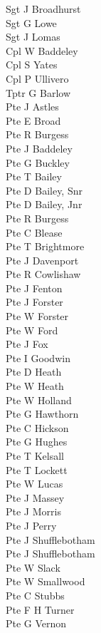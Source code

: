 \begin{multicols}{2}
  Sgt J Broadhurst \\
  Sgt G Lowe \\
  Sgt J Lomas \\
  Cpl W Baddeley \\
  Cpl S Yates \\
  Cpl P Ullivero \\
  Tptr G Barlow \\
  Pte J Astles \\
  Pte E Broad \\
  Pte R Burgess \\
  Pte J Baddeley \\
  Pte G Buckley \\
  Pte T Bailey \\
  Pte D Bailey, Snr \\
  Pte D Bailey, Jnr \\
  Pte R Burgess \\
  Pte C Blease \\
  Pte T Brightmore \\
  Pte J Davenport \\
  Pte R Cowlishaw \\
  Pte J Fenton \\
  Pte J Forster \\
  Pte W Forster \\
  Pte W Ford \\
  Pte J Fox \\
  Pte I Goodwin \\
  Pte D Heath \\
  Pte W Heath \\
  Pte W Holland \\
  Pte G Hawthorn \\
  Pte C Hickson \\
  Pte G Hughes \\
  Pte T Kelsall \\
  Pte T Lockett \\
  Pte W Lucas \\
  Pte J Massey \\
  Pte J Morris \\
  Pte J Perry \\
  Pte J Shufflebotham \\
  Pte J Shufflebotham \\
  Pte W Slack \\
  Pte W Smallwood \\
  Pte C Stubbs \\
  Pte F H Turner \\
  Pte G Vernon \\

\end{multicols}
